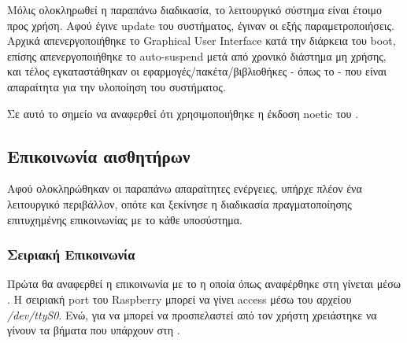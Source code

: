 Μόλις ολοκληρωθεί η παραπάνω διαδικασία, το λειτουργικό σύστημα είναι έτοιμο προς χρήση. Αφού έγινε update του συστήματος, έγιναν οι εξής παραμετροποιήσεις. Αρχικά απενεργοποιήθηκε το Graphical User Interface κατά την διάρκεια του boot, επίσης απενεργοποιήθηκε το auto-suspend μετά από χρονικό διάστημα μη χρήσης, και τέλος εγκαταστάθηκαν οι εφαρμογές/πακέτα/βιβλιοθήκες - όπως το  - που είναι απαραίτητα για την υλοποίηση του συστήματος. 

Σε αυτό το σημείο να αναφερθεί ότι χρησιμοποιήθηκε η έκδοση noetic του .



\subsection{Επικοινωνία αισθητήρων} 
Αφού ολοκληρώθηκαν οι παραπάνω απαραίτητες ενέργειες, υπήρχε πλέον ένα λειτουργικό περιβάλλον, οπότε και ξεκίνησε η διαδικασία πραγματοποίησης ε\-πι\-τυ\-χη\-μέ\-νης επικοινωνίας με το κάθε υποσύστημα.


\subsubsection{Σειριακή Επικοινωνία}
Πρώτα θα αναφερθεί η επικοινωνία με το  η οποία όπως αναφέρθηκε στη  γίνεται μέσω . Η σειριακή port του Raspberry μπορεί να γίνει access μέσω του αρχείου \textit{/dev/ttyS0}. Ενώ, για να μπορεί να προσπελαστεί από τον χρήστη χρειάστηκε να γίνουν τα βήματα \cite{serial-fix} που υπάρχουν στη .
\newpage

